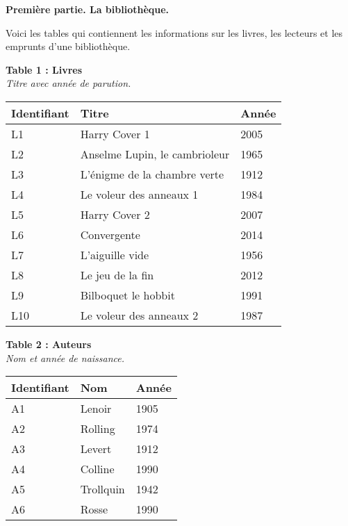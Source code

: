 \documentclass[class=report,crop=false, 12pt]{standalone}
\begin{document}
\newcommand{\ducode}[1]{\textsf{#1}}



\vspace*{-3ex}

\textbf{Première partie. La bibliothèque.}

Voici les tables qui contiennent les informations sur les livres, les lecteurs et les emprunts d'une bibliothèque.

\vspace*{-2ex}

{\footnotesize
\begin{center}
\begin{minipage}{0.6\textwidth}

\textbf{Table 1 : Livres}\\
\emph{Titre avec année de parution.} \\

\begin{tabular}{|l|l|l|} \hline
\textbf{Identifiant} & \textbf{Titre} & \textbf{Année} \\ \hline\hline
L1 & Harry Cover 1 & 2005 \\ \hline
L2 & Anselme Lupin, le cambrioleur & 1965 \\ \hline
L3 & L'énigme de la chambre verte & 1912 \\ \hline
L4 & Le voleur des anneaux 1 & 1984 \\ \hline
L5 & Harry Cover 2 & 2007 \\ \hline 
L6 & Convergente & 2014 \\ \hline
L7 & L'aiguille vide & 1956 \\ \hline
L8 & Le jeu de la fin & 2012 \\ \hline 
L9 & Bilboquet le hobbit & 1991 \\ \hline
L10 & Le voleur des anneaux 2 & 1987 \\ \hline 
\end{tabular}
\end{minipage}
%
%
\begin{minipage}{0.3\textwidth}

\textbf{Table 2 : Auteurs}\\
\emph{Nom et année de naissance.} \\

\begin{tabular}{|l|l|l|} \hline
\textbf{Identifiant} & \textbf{Nom} & \textbf{Année} \\ \hline\hline
A1 & Lenoir & 1905 \\ \hline
A2 & Rolling & 1974 \\ \hline
A3 & Levert & 1912 \\ \hline
A4 & Colline & 1990 \\ \hline
A5 & Trollquin & 1942 \\ \hline
A6 & Rosse & 1990 \\ \hline 
\end{tabular}
\end{minipage}
\end{center}
}
%
%
\end{document}
